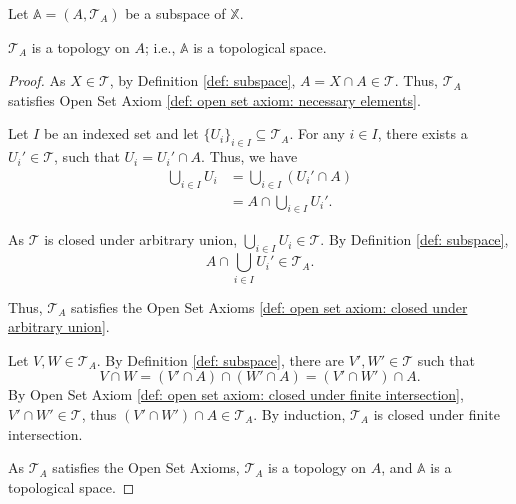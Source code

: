\begin{theorem}
	Let $\mathbb A = (A, \mathcal T_A)$ be a subspace of $\mathbb X$.
	
	$\mathcal T_A$ is a topology on $A$; i.e., $\mathbb A$ is a topological space.
	
	\begin{proof}
		As $X \in \mathcal T$, by Definition \ref{def: subspace}, $A = X \cap A \in \mathcal T$. Thus, $\mathcal T_A$ satisfies Open Set Axiom \ref{def: open set axiom: necessary elements}.
		\qedlm
		
		Let $I$ be an indexed set and let $\{ U_i \}_{i \in I} \subseteq \mathcal T_A$. For any $i \in I$, there exists a $U_i' \in \mathcal T$, such that $U_i = U_i' \cap A$. Thus, we have
		$$
		\begin{aligned}
			\bigcup_{i \in I} U_i &= \bigcup_{i \in I} (U_i' \cap A) \\
			&= A \cap \bigcup_{i \in I} U_i'.
		\end{aligned}
		$$
		
		As $\mathcal T$ is closed under arbitrary union, $\bigcup_{i \in I} U_i \in \mathcal T$. By Definition \ref{def: subspace},
		$$
		A \cap \bigcup_{i \in I} U_i' \in \mathcal T_A.
		$$
		
		Thus, $\mathcal T_A$ satisfies the Open Set Axioms \ref{def: open set axiom: closed under arbitrary union}.
		\qedlm
		
		Let $V, W \in \mathcal T_A$. By Definition \ref{def: subspace}, there are $V', W' \in \mathcal T$ such that
		$$
		V \cap W = (V' \cap A) \cap (W' \cap A) = (V' \cap W') \cap A.
		$$
		By Open Set Axiom \ref{def: open set axiom: closed under finite intersection}, $V' \cap W' \in \mathcal T$, thus $(V' \cap W') \cap A \in \mathcal T_A$. By induction, $\mathcal T_A$ is closed under finite intersection.
		\qedlm
		
		As $\mathcal T_A$ satisfies the Open Set Axioms, $\mathcal T_A$ is a topology on $A$, and $\mathbb A$ is a topological space.
	\end{proof}
\end{theorem}





















%